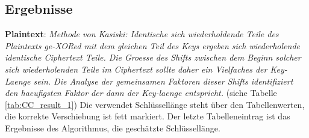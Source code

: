 \subsection{Ergebnisse}
\textbf{Plaintext}: \textit{Methode von Kasiski: Identische sich wiederholdende Teile des Plaintexts ge-XORed mit dem gleichen Teil des Keys ergeben sich
wiederholende identische Ciphertext Teile. Die Groesse des Shifts
zwischen dem Beginn solcher sich wiederholenden Teile im
Ciphertext sollte daher ein Vielfaches der Key-Laenge sein. Die
Analyse der gemeinsamen Faktoren dieser Shifts identifiziert den
haeufigsten Faktor der dann der Key-laenge entspricht.} (siehe Tabelle \ref{tab:CC_result_1})\vspace*{1em}\newline
Die verwendet Schlüssellänge steht über den Tabellenwerten, die korrekte Verschiebung ist fett markiert. Der letzte Tabelleneintrag
ist das Ergebnisse des Algorithmus, die geschätzte Schlüssellänge.
